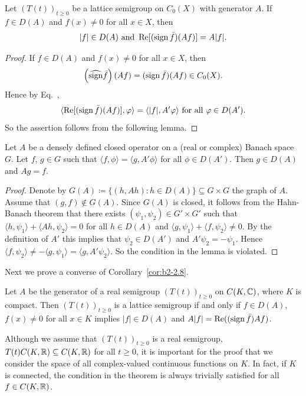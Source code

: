 \begin{corollary}\label{cor:b2-2.8}
Let $(T(t))_{t \geq 0}$ be a lattice semigroup on $C_{0}(X)$ with generator $A$.
If\/ $f \in D(A)$ and $f(x) \neq 0$ for all $x \in X$, then 
\[
|f| \in D(A) \text{ and } \mathop{}\!\mathrm{Re}[(\operatorname{sign} \bar{f})(Af)] = A|f| .
\]
\end{corollary}
\begin{proof}
If\/ $f \in D(A)$ and $f(x) \neq 0$ for all $x \in X$, then \[
\left(\widehat{\operatorname{sign}} \bar{f}\right)(Af) = (\operatorname{sign} \bar{f})(Af) \in C_{0}(X).
\]
Hence by Eq.~, 
\[
\langle \Re[(\sign \bar{f})(Af)],\phi \rangle = \langle |f|,A'\phi \rangle \text{ for all } \phi \in D(A').
\]
So the assertion follows from the following lemma.
\end{proof}
\begin{lemma}\label{lem:b2-2.9}
Let $A$ be a densely defined closed operator on a (real or complex) Banach space $G$.
Let $f$, $g \in G$ such that $\langle f,\phi \rangle = \langle g,A'\phi \rangle$ for all $\phi \in D(A')$.
Then $g \in D(A)$ and $Ag = f$.
\end{lemma}
\begin{proof}
Denote by $G(A) \coloneq \{(h,Ah) \colon h \in D(A)\} \subseteq G \times G$ the graph of\/ $A$.
Assume that $(g,f) \notin G(A)$.
Since $G(A)$ is closed, it follows from the Hahn-Banach theorem that there exists $(\psi_{1},\psi_{2}) \in G' \times G'$ such that $\langle h,\psi_{1} \rangle + \langle Ah,\psi_{2} \rangle = 0$ for all $h \in D(A)$ and $\langle g,\psi_{1} \rangle + \langle f,\psi_{2} \rangle \neq 0$.
By the definition of\/ $A'$ this implies that $\psi_{2} \in D(A')$ and $A'\psi_{2} = -\psi_{1}$.
Hence $\langle f,\psi_{2} \rangle \neq -\langle g,\psi_{1} \rangle = \langle g,A'\psi_{2} \rangle$.
So the condition in the lemma is violated.
\end{proof}
Next we prove a converse of Corollary~\ref{cor:b2-2.8}.
\begin{theorem}\label{thm:b2-2.10}
Let $A$ be the generator of a real semigroup $(T(t))_{t \geq 0}$ on $C(K,\mathbb{C})$, where $K$ is compact.
Then $(T(t))_{t \geq 0}$ is a lattice semigroup if and only if\/ $f \in D(A)$, $f(x) \neq 0$ for all $x \in K$ implies $|f| \in D(A)$ and $A|f| = \mathop{}\!\mathrm{Re}((\operatorname{sign} \bar{f})Af)$.
\end{theorem}
\begin{remark*}\label{rem:b2-2.10-KGK}
Although we assume that $(T(t))_{t \geq 0}$ is a real semigroup, \ie $T(t)C(K,\mathbb{R}) \subseteq C(K,\mathbb{R})$ for all $t \geq 0$,
it is important for the proof that we consider the space of all complex-valued continuous functions on $K$.
In fact, if\/ $K$ is connected, the condition in the theorem is always trivially satisfied for all $f \in C(K,\mathbb{R})$.
\end{remark*}
